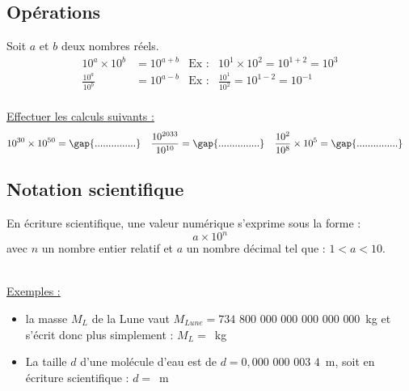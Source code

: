 \subsection{Opérations}
\begin{tcolorbox}[colback=red!5!white,colframe=red!75!black,title=\textbf{Règles de calculs des puissances de 10}]
Soit $a$ et $b$ deux nombres réels.
\begin{align*}
    10^{a}\times 10^b &= 10^{a+b} & \text{Ex :}& 10^{1}\times 10^2 = 10^{1+2}=10^3 \\
    \frac{10^{a}}{10^b} &= 10^{a-b} & \text{Ex :}& \frac{10^{1}}{10^2} = 10^{1-2}=10^{-1} \\
\end{align*}

\end{tcolorbox}
\underline{Effectuer les calculs suivants :}
\begin{align*}
    10^{30} \times 10^{50} &= \text{\gap{...............}} & \frac{10^{2033}}{10^{10}} &= \text{\gap{...............}} & \frac{10^2}{10^8}\times 10^5 &= \text{\gap{...............}}
\end{align*}
\subsection{Notation scientifique}

\begin{tcolorbox}[colback=green!5!white,colframe=green!75!black,title=\textbf{Ecriture scientifique d'un nombre}]
En écriture scientifique, une valeur numérique s'exprime sous la forme :
\begin{equation*}
    a \times 10^n
\end{equation*}
avec $n$ un nombre entier relatif et $a$ un nombre décimal tel que : $1< a <10$.\\
\\
\end{tcolorbox}
\underline{Exemples :}
\begin{itemize}
    \item la masse $M_{L}$ de la Lune vaut $M_{Lune}=734$ $800$ $000$ $000$ $000$ $000$ $000$~kg et s'écrit donc plus simplement : $M_L=$~kg
    \item La taille $d$ d'une molécule d'eau est de  $d=0,000$ $000$ $003$ $4$~m, soit en écriture scientifique : $d=$~m
\end{itemize}


